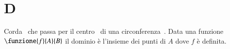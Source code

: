 \chapter{D}
\vspace{5mm} 
Corda\pointsto~ che passa per il centro\pointsto~ di una circonferenza\pointsto~.
Data una funzione $\funzione{f}{A}{B}$ il dominio è l'insieme dei punti di $A$ dove $f$ è definita.
